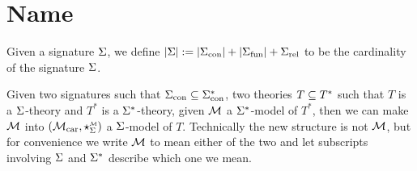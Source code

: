 \section{Name}

\begin{dfn}
    Given a signature $\Sigma$, 
    we define 
    $|\Sigma| := |\Sigma_\mathrm{con}| + |\Sigma_\mathrm{fun}| + \Sigma_\mathrm{rel}$
    to be the cardinality of the signature $\Sigma$.
\end{dfn}

\begin{prop}
    Given two signatures such that $\Sigma_\mathrm{con} \subseteq \Sigma^*_\mathrm{con}$, 
    two theories $T \subseteq T^*$ such that $T$ is a $\Sigma$-theory and $T^*$ is a $\Sigma^*$-theory,
    given $\mathcal{M}$ a $\Sigma^*$-model of $T^*$,
    then we can make $\mathcal{M}$ into $(\carrier{\MM},\intp{\Si}{\MM})$
    a $\Sigma$-model of $T$.
    Technically the new structure is not $\mathcal{M}$,
    but for convenience we write 
    $\mathcal{M}$ to mean either of the two and let subscripts involving 
    $\Sigma$ and $\Sigma^*$ describe which one we mean.
\end{prop}
